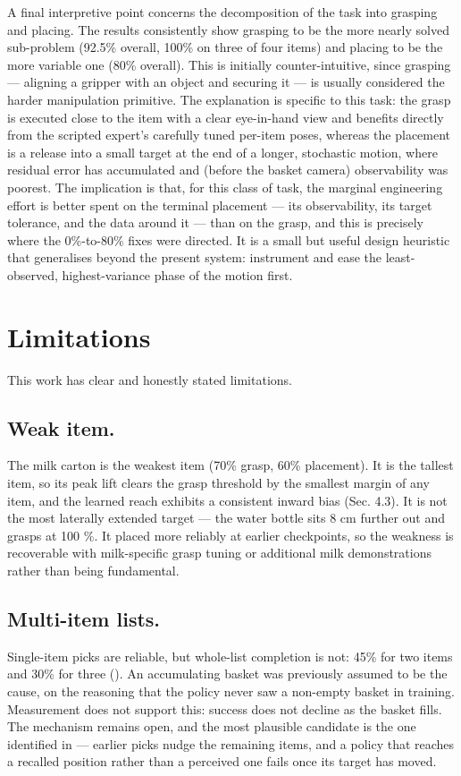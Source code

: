A final interpretive point concerns the decomposition of the task into grasping and
placing. The results consistently show grasping to be the more nearly solved
sub-problem (92.5\% overall, 100\% on three of four items) and placing to be the more
variable one (80\% overall). This is initially counter-intuitive, since grasping ---
aligning a gripper with an object and securing it --- is usually considered the harder
manipulation primitive. The explanation is specific to this task: the grasp is
executed close to the item with a clear eye-in-hand view and benefits directly from
the scripted expert's carefully tuned per-item poses, whereas the placement is a
release into a small target at the end of a longer, stochastic motion, where residual
error has accumulated and (before the basket camera) observability was poorest. The
implication is that, for this class of task, the marginal engineering effort is better
spent on the terminal placement --- its observability, its target tolerance, and the
data around it --- than on the grasp, and this is precisely where the 0\%-to-80\% fixes
were directed. It is a small but useful design heuristic that generalises beyond the
present system: instrument and ease the least-observed, highest-variance phase of the
motion first.

\section{Limitations}
\label{sec:disc-limits}
This work has clear and honestly stated limitations.

\subsection{Weak item.} The milk carton is the weakest item (70\% grasp, 60\%
placement). It is the tallest item, so its peak lift clears the grasp threshold by the smallest margin of any item, and the learned reach exhibits a consistent inward bias (Sec. 4.3). It is not the most laterally extended target — the water bottle sits 8 cm further out and grasps at 100 \%. It placed more reliably at earlier checkpoints, so the weakness is recoverable with milk-specific grasp tuning or additional milk demonstrations rather than being fundamental.

\subsection{Multi-item lists.} Single-item picks are reliable, but whole-list
completion is not: 45\% for two items and 30\% for three
(). An accumulating basket was previously assumed to
be the cause, on the reasoning that the policy never saw a non-empty basket in
training. Measurement does not support this: success does not decline as the basket
fills. The mechanism remains open, and the most plausible candidate is the one
identified in  --- earlier picks nudge the remaining items,
and a policy that reaches a recalled position rather than a perceived one fails once
its target has moved.

